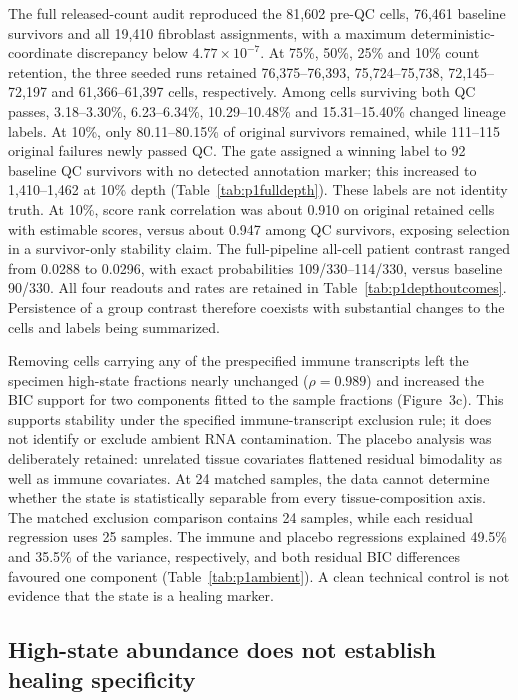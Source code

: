 \documentclass[10pt,a4paper]{article}
\begin{document}
The full released-count audit reproduced the 81,602 pre-QC cells, 76,461 baseline survivors and all 19,410 fibroblast assignments, with a maximum deterministic-coordinate discrepancy below $4.77\times10^{-7}$. At 75\%, 50\%, 25\% and 10\% count retention, the three seeded runs retained 76,375--76,393, 75,724--75,738, 72,145--72,197 and 61,366--61,397 cells, respectively. Among cells surviving both QC passes, 3.18--3.30\%, 6.23--6.34\%, 10.29--10.48\% and 15.31--15.40\% changed lineage labels. At 10\%, only 80.11--80.15\% of original survivors remained, while 111--115 original failures newly passed QC. The gate assigned a winning label to 92 baseline QC survivors with no detected annotation marker; this increased to 1,410--1,462 at 10\% depth (Table~\ref{tab:p1fulldepth}). These labels are not identity truth. At 10\%, score rank correlation was about 0.910 on original retained cells with estimable scores, versus about 0.947 among QC survivors, exposing selection in a survivor-only stability claim. The full-pipeline all-cell patient contrast ranged from 0.0288 to 0.0296, with exact probabilities 109/330--114/330, versus baseline 90/330. All four readouts and rates are retained in Table~\ref{tab:p1depthoutcomes}. Persistence of a group contrast therefore coexists with substantial changes to the cells and labels being summarized.

Removing cells carrying any of the prespecified immune transcripts left the specimen high-state fractions nearly unchanged ($\rho=0.989$) and increased the BIC support for two components fitted to the sample fractions (Figure~3c). This supports stability under the specified immune-transcript exclusion rule; it does not identify or exclude ambient RNA contamination. The placebo analysis was deliberately retained: unrelated tissue covariates flattened residual bimodality as well as immune covariates. At 24 matched samples, the data cannot determine whether the state is statistically separable from every tissue-composition axis. The matched exclusion comparison contains 24 samples, while each residual regression uses 25 samples. The immune and placebo regressions explained 49.5\% and 35.5\% of the variance, respectively, and both residual BIC differences favoured one component (Table~\ref{tab:p1ambient}). A clean technical control is not evidence that the state is a healing marker.

\subsection{High-state abundance does not establish healing specificity}
\end{document}
